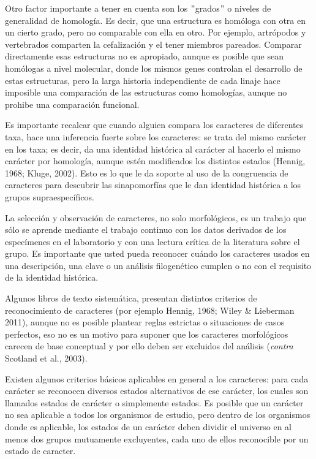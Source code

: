 Otro factor importante a tener en cuenta son los $"$grados$"$ o 
niveles de generalidad de homolog\'ia. Es decir, que una estructura 
es hom\'ologa con otra en un cierto grado, pero no comparable con 
ella en otro. Por ejemplo, artr\'opodos y vertebrados comparten la 
cefalizaci\'on y el tener miembros pareados. Comparar directamente 
esas estructuras no es apropiado, aunque es posible que sean 
hom\'ologas a nivel molecular, donde los mismos genes controlan el 
desarrollo de estas estructuras, pero la larga historia 
independiente de cada linaje hace imposible una comparaci\'on de las 
estructuras como homolog\'ias, aunque no prohibe una comparaci\'on 
funcional. 

Es importante recalcar que cuando alguien compara los 
caracteres de diferentes taxa, hace una inferencia fuerte sobre los 
caracteres: se trata del mismo car\'acter en los taxa; es decir, da 
una identidad hist\'orica al car\'acter al hacerlo el mismo car\'acter 
por homolog\'ia, aunque est\'en modificados los distintos 
estados (Hennig, 1968; Kluge, 2002). Esto es lo que le da soporte al 
uso de la congruencia de caracteres para descubrir las sinapomorf\'
ias que le dan identidad hist\'orica a los grupos supraespec\'ificos.

 
La selecci\'on y observaci\'on de caracteres, no solo morfol\'ogicos, es un trabajo que s\'olo se aprende mediante el trabajo continuo con los datos derivados de los espec\'imenes en el laboratorio y con una lectura cr\'itica de la literatura sobre el grupo. Es importante que usted pueda reconocer cu\'ando los caracteres usados en una descripci\'on, una clave o un an\'alisis filogen\'etico cumplen o no con el requisito de la identidad hist\'orica.


Algunos libros de texto  sistem\'atica, presentan distintos criterios de reconocimiento de caracteres (por ejemplo Hennig, 1968; Wiley \&  Lieberman 2011), aunque no es posible plantear reglas estrictas o situaciones de casos perfectos, eso no es un motivo para suponer que los caracteres morfol\'ogicos carecen de base conceptual y por ello deben ser excluidos del an\'alisis (\textit{contra} Scotland et al., 2003).

Existen algunos criterios b\'asicos aplicables en general a los caracteres: para cada car\'acter se reconocen diversos estados alternativos de ese car\'acter, los cuales son llamados estados de car\'acter o simplemente estados. Es posible que un car\'acter no sea aplicable a todos los organismos de estudio, pero dentro de los organismos donde es aplicable, los estados de un car\'acter deben dividir el universo en al menos dos grupos mutuamente excluyentes, cada uno de ellos reconocible por un estado de caracter.


